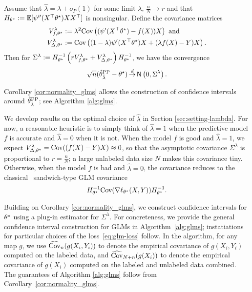 \begin{corollary}
  \label{cor:normality_glms}
  Assume that $\hat\lambda = \lambda + o_P(1)$ for some limit $\lambda$,
  $\frac{n}{N} \rightarrow r$ and that
  $H_{\theta^\star}:=\mathbb{E}[\psi''(X^\top\theta^\star) X X^\top]$ is
  nonsingular. Define the covariance matrices
  \begin{align*}
    V_{f,\theta^\star}^\lambda &:= \lambda^2 \textup{Cov}\left( (\psi'(X^\top\theta^\star)-f(X)) X \right)\text{ and }\\
    V_{\Delta,\theta^\star}^\lambda  &:= \textup{Cov}\left( (1-\lambda)\psi'(X^\top\theta^\star)X
    + ( \lambda f(X) - Y) X\right).
  \end{align*}
  Then for $\Sigma^{\lambda} := H_{\theta^\star}^{-1} \left(r V_{f,\theta^\star}^\lambda  + V_{\Delta,\theta^\star}^\lambda \right) H_{\theta^\star}^{-1}$, we have the convergence
  \begin{equation*}
    \sqrt{n}(\hat{\theta}^{\mathrm{PP}}_{\hat\lambda} - \theta^\star) \mathop{\stackrel{d}{\rightarrow}} \mathsf{N}\left(0,
    \Sigma^{\lambda} \right).
  \end{equation*}
\end{corollary}
\noindent Corollary \ref{cor:normality_glms} allows the construction of confidence intervals around $\hat{\theta}^{\mathrm{PP}}_{\hat\lambda}$; see Algorithm \ref{alg:glms}.

We develop results on the optimal choice of $\hat \lambda$ in Section
\ref{sec:setting-lambda}. For now, a reasonable heuristic is to simply think
of $\hat\lambda = 1$ when the predictive model $f$ is accurate and
$\hat\lambda = 0$ when it is not.  When the model $f$ is good and
$\hat\lambda = 1$, we expect $V_{\Delta,\theta^\star}^\lambda = \textup{Cov}((f(X) -
Y)X) \approx 0$, so that the asymptotic covariance $\Sigma^{\lambda}$ is
proportional to $r = \frac{n}{N}$; a large unlabeled data size $N$ makes
this covariance tiny.
%
Otherwise, when the model $f$ is bad and $\hat\lambda = 0$, the covariance
reduces to the classical~\cite{VanDerVaart98, Efron22} sandwich-type GLM
covariance
\begin{equation*}
  H_{\theta^\star}^{-1} \textup{Cov}(\nabla \ell_{\theta^\star}(X, Y)) H_{\theta^\star}^{-1}.
\end{equation*}

Building on Corollary \ref{cor:normality_glms}, we construct confidence
intervals for $\theta^\star$ using a plug-in estimator for
$\Sigma^{\lambda}$. For concreteness, we provide the general
confidence interval construction for GLMs in Algorithm~\ref{alg:glms};
instatiations for particular choices of the loss~\eqref{eq:glm-loss}
follow. In the algorithm, for any map $g$, we use $\widehat{\mathrm{Cov}}_n(g(X_i,Y_i))$
to denote the empirical covariance of $g(X_i,Y_i)$ computed on the labeled
data, and $\widehat{\mathrm{Cov}}_{N+n}(g(X_i))$ to denote the empirical covariance of
$g(X_i)$ computed on the labeled and unlabeled data combined.
The guarantees of Algorithm \ref{alg:glms} follow from
Corollary~\ref{cor:normality_glms}.

